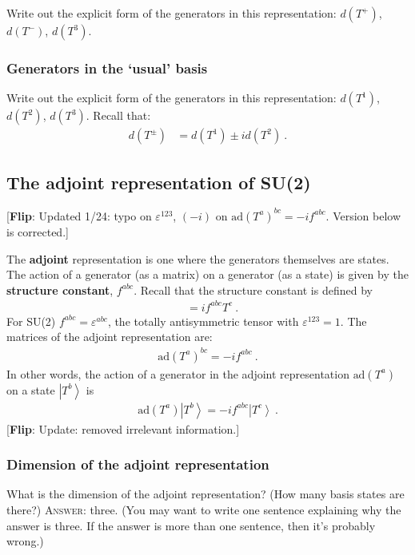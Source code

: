 \documentclass[12pt]{article}
\numberwithin{equation}{subsection}    %
\newcommand{\ket}[1]{\left|#1\right\rangle}    %
\newcommand{\flip}[1]{{\color{red} [\textbf{Flip}: {#1}]}}
\begin{document}
Write out the explicit form of the generators in this representation: $d(T^+)$, $d(T^-)$, $d(T^3)$.

\subsubsection{Generators in the `usual' basis}

Write out the explicit form of the generators in this representation: $d(T^1)$, $d(T^2)$, $d(T^3)$. Recall that:
\begin{align}
  d(T^\pm) &= d(T^1) \pm i d(T^2) \ .
\end{align}

\subsection{The adjoint representation of SU(2)}

\flip{Updated 1/24: typo on $\varepsilon^{123}$, $(-i)$ on $\text{ad}(T^a)^{bc} = -if^{abc}$. Version below is corrected.}

The \textbf{adjoint} representation is one where the generators themselves are states. The action of a generator (as a matrix) on a generator (as a state) is given by the \textbf{structure constant}, $f^{abc}$. Recall that the structure constant is defined by
\begin{align}
  [T^a, T^b] &= i f^{abc}T^c \ .
\end{align}
For SU(2) $f^{abc} = \varepsilon^{abc}$, the totally antisymmetric tensor with $\varepsilon^{123} = 1$. The matrices of the adjoint representation are:
\begin{align}
  \text{ad}(T^a)^{bc} = -i f^{abc} \ .
\end{align}
In other words, the action of a generator in the adjoint representation $\text{ad}(T^a)$ on a state $\ket{T^b}$ is
\begin{align}
  \text{ad}(T^a)\ket{T^b} = -if^{abc}\ket{T^c} \ .
\end{align}
\flip{Update: removed irrelevant information.}

\subsubsection{Dimension of the adjoint representation}

What is the dimension of the adjoint representation? (How many basis states are there?) \textsc{Answer}: three. (You may want to write one sentence explaining why the answer is three. If the answer is more than one sentence, then it's probably wrong.)
\end{document}
